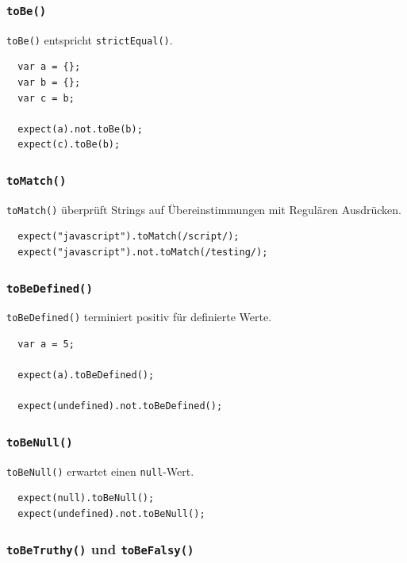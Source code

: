 \documentclass[11pt, a4paper]{article}
\begin{document}
\subsubsection*{\texttt{toBe()}}

\texttt{toBe()} entspricht \texttt{strictEqual()}.

\begin{verbatim}
  var a = {};
  var b = {};
  var c = b;

  expect(a).not.toBe(b);
  expect(c).toBe(b);
\end{verbatim}

\subsubsection*{\texttt{toMatch()}}

\texttt{toMatch()} überprüft Strings auf Übereinstimmungen mit Regulären
Ausdrücken.

\begin{verbatim}
  expect("javascript").toMatch(/script/);
  expect("javascript").not.toMatch(/testing/);
\end{verbatim}

\subsubsection*{\texttt{toBeDefined()}}

\texttt{toBeDefined()} terminiert positiv für definierte Werte.

\begin{verbatim}
  var a = 5;

  expect(a).toBeDefined();

  expect(undefined).not.toBeDefined();
\end{verbatim}

\subsubsection*{\texttt{toBeNull()}}

\texttt{toBeNull()} erwartet einen \texttt{null}-Wert.

\begin{verbatim}
  expect(null).toBeNull();
  expect(undefined).not.toBeNull();
\end{verbatim}

\subsubsection*{\texttt{toBeTruthy()} und \texttt{toBeFalsy()}}
\end{document}
